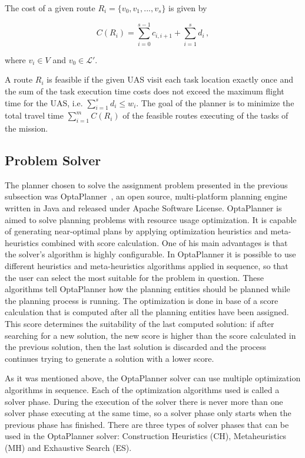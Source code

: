 \documentclass[twocolumn]{svjour3}          %
\begin{document}
	The cost of a given route ${R_{i} = \{v_0, v_1, ..., v_s}\}$ is given by 

 \begin{equation}
 	{C(R_{i}) = \sum_{i=0}^{s-1} c_{i,i+1} + \sum_{i=1}^{s} d_{i}} \, ,
 	\label{eq:route_cost}
 \end{equation}	

\noindent where ${v_i \in V}$ and ${v_0 \in \mathcal{L'}}$.

	A route ${R_{i}}$ is feasible if the given UAS visit each task location exactly once and the sum of the task execution time costs does not exceed the maximum flight time for the UAS, i.e. $\sum_{i=1}^{s} d_{i} \leq w_i$. The goal of the planner is to minimize the total travel time $\sum_{i=1}^{m} C(R_{i})$ of the feasible routes executing of the tasks of the mission.
	
\subsection{Problem Solver}
    \label{sec:opt}
    
The planner chosen to solve the assignment problem presented in the previous subsection was OptaPlanner~\cite{optaplanner}, an open source, multi-platform planning engine written in Java and released under Apache Software License. OptaPlanner is aimed to solve planning problems with resource usage optimization. It is capable of generating near-optimal plans by applying optimization heuristics and meta-heuristics combined with score calculation. One of his main advantages is that the solver's algorithm is highly configurable. In OptaPlanner it is possible to use different heuristics and meta-heuristics algorithms applied in sequence, so that the user can select the most suitable for the problem in question. These algorithms tell OptaPlanner how the planning entities should be planned while the planning process is running. The optimization is done in base of a score calculation that is computed after all the planning entities have been assigned. This score determines the suitability of the last computed solution: if after searching for a new solution, the new score is higher than the score calculated in the previous solution, then the last solution is discarded and the process continues trying to generate a solution with a lower score.

As it was mentioned above, the OptaPlanner solver can use multiple optimization algorithms in sequence. Each of the optimization algorithms used is called a solver phase. During the execution of the solver there is never more than one solver phase executing at the same time, so a solver phase only starts when the previous phase has finished. There are three types of solver phases that can be used in the OptaPlanner solver: Construction Heuristics (CH), Metaheuristics (MH) and Exhaustive Search (ES). 
\end{document}
